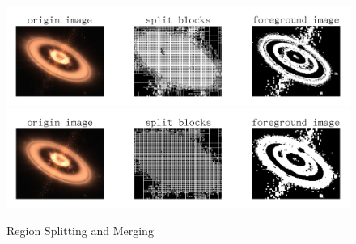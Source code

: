 \begin{figure}[htbp]
    \centering
	\includegraphics[width=\textwidth]{../images/p2/p2b_blocksize_4.png}
	\includegraphics[width=\textwidth]{../images/p2/p2b_blocksize_8.png}
    \caption{Region Splitting and Merging}
    \label{fig:p2b}
\end{figure}

\newpage